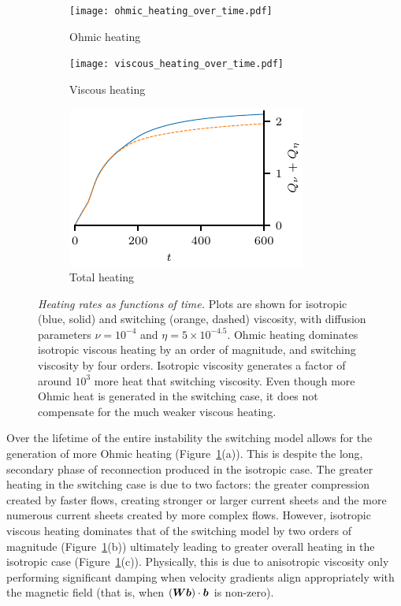 \begin{figure}[t]
    \centering
    \begin{subfigure}[t]{0.32\textwidth}
      \texttt{[image: ohmic\_heating\_over\_time.pdf]}
      \caption{Ohmic heating}
    \end{subfigure}
    \begin{subfigure}[t]{0.32\textwidth}
      \texttt{[image: viscous\_heating\_over\_time.pdf]}
      \caption{Viscous heating}
    \end{subfigure}
    \begin{subfigure}[t]{0.32\textwidth}
      \includegraphics[width=\textwidth]{total_heating_over_time.pdf}
      \caption{Total heating}
    \end{subfigure}
    \caption{\textit{Heating rates as functions of time.} Plots are shown for isotropic (blue, solid) and switching (orange, dashed) viscosity, with diffusion parameters $\nu = 10^{-4}$ and $\eta = 5\times 10^{-4.5}$. Ohmic heating dominates isotropic viscous heating by an order of magnitude, and switching viscosity by four orders. Isotropic viscosity generates a factor of around $10^{3}$ more heat that switching viscosity. Even though more Ohmic heat is generated in the switching case, it does not compensate for the much weaker viscous heating.}
    \label{fig:heating}
\end{figure}

Over the lifetime of the entire instability the switching model allows for the generation of more Ohmic heating (Figure~\ref{fig:heating}(a)). This is despite the long, secondary phase of reconnection produced in the isotropic case. The greater heating in the switching case is due to two factors: the greater compression created by faster flows, creating stronger or larger current sheets and the more numerous current sheets created by more complex flows. However, isotropic viscous heating dominates that of the switching model by two orders of magnitude (Figure~\ref{fig:heating}(b)) ultimately leading to greater overall heating in the isotropic case (Figure~\ref{fig:heating}(c)). Physically, this is due to anisotropic viscosity only performing significant damping when velocity gradients align appropriately with the magnetic field (that is, when $({\bm W} {\bm b}) \cdot {\bm b}$ is non-zero). 

